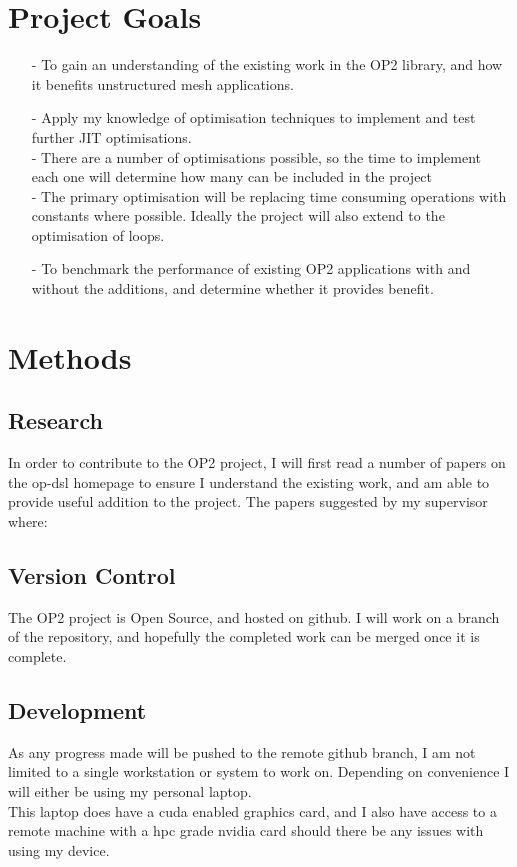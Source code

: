 \documentclass[11pt]{article}
\begin{document}
\section*{Project Goals}
 \begin{itemize}
  \item[-]{To gain an understanding of the existing work in the OP2 library, and how it benefits unstructured mesh applications.}
  \item[-]{Apply my knowledge of optimisation techniques to implement and test further JIT optimisations.}\\
- There are a number of optimisations possible, so the time to implement each one will determine how many can be included in the project
\\
- The primary optimisation will be replacing time consuming operations with constants where possible. Ideally the project will also extend to the optimisation of loops.
  \item[-]{To benchmark the performance of existing OP2 applications with and without the additions, and determine whether it provides benefit.}
 \end{itemize}
\section*{Methods}
\subsection*{Research}
In order to contribute to the OP2 project, I will first read a number of papers on the op-dsl homepage to ensure I understand the existing work, and am able to provide useful addition to the project. 
The papers suggested by my supervisor where:  
\subsection*{Version Control}
The OP2 project is Open Source, and hosted on github. I will work on a branch of the repository, and hopefully the completed work can be merged once it is complete.
\subsection*{Development}
As any progress made will be pushed to the remote github branch, I am not limited to a single workstation or system to work on. Depending on convenience I will either be using my personal laptop.\\
This laptop does have a cuda enabled graphics card, and I also have access to a remote machine with a hpc grade nvidia card should there be any issues with using my device.
\end{document}
